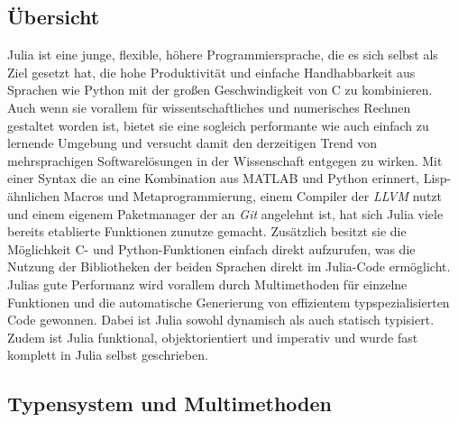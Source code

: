 \documentclass[proseminar,german,utf8]{zihpub}
\begin{document}
\subsection{Übersicht}

Julia ist eine junge, flexible, höhere Programmiersprache, die es sich selbst als Ziel gesetzt hat, die hohe Produktivität und einfache Handhabbarkeit aus Sprachen wie Python mit der großen Geschwindigkeit von C zu kombinieren. Auch wenn sie vorallem für wissentschaftliches und numerisches Rechnen gestaltet worden ist, bietet sie eine sogleich performante wie auch einfach zu lernende Umgebung und versucht damit den derzeitigen Trend von mehrsprachigen Softwarelösungen in der Wissenschaft entgegen zu wirken. Mit einer Syntax die an eine Kombination aus MATLAB und Python erinnert, Lisp-ähnlichen Macros und Metaprogrammierung, einem Compiler der \textit{LLVM} nutzt und einem eigenem Paketmanager der an \textit{Git} angelehnt ist, hat sich Julia viele bereits etablierte Funktionen zunutze gemacht. Zusätzlich besitzt sie die Möglichkeit C- und Python-Funktionen einfach direkt aufzurufen, was die Nutzung der Bibliotheken der beiden Sprachen direkt im Julia-Code ermöglicht. Julias gute Performanz wird vorallem durch Multimethoden für einzelne Funktionen und die automatische Generierung von effizientem typspezialisierten Code gewonnen. Dabei ist Julia sowohl dynamisch als auch statisch typisiert. Zudem ist Julia funktional, objektorientiert und imperativ und wurde fast komplett in Julia selbst geschrieben. ~\cite{NominalTypSystemWiki}~\cite{TypSystemWiki}~\cite{JuliaLangIntro}~\cite{JuliaBasicHeise}

\subsection{Typensystem und Multimethoden}
\end{document}
